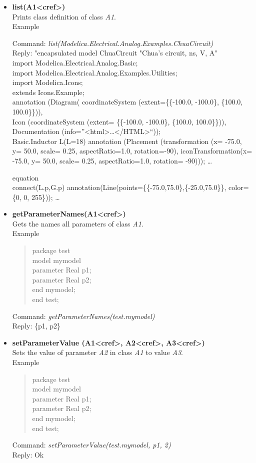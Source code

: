 \documentclass[11pt,a4paper,oneside,english]{book}
\newenvironment{modelicaExamples}{\begin{itemize}}{\end{itemize}}
\newcommand{\api}[2]{\item \textbf{#1} \\ #2}
\newcommand{\tab}{\hspace{2em}}
\newcommand{\command}[1]{Command: \textit{#1}\\}
\newcommand{\reply}[1]{Reply: #1}
\newcommand{\functionex}[2]{\begin{singlespace} \command{#1} \reply{#2} \end{singlespace}}
\newcommand{\examples}{Example}
\newenvironment{mocode}{\begin{verse}\begin{singlespace}\begin{scriptsize}\ttfamily}{\end{scriptsize}\end{singlespace}\end{verse}}
\begin{document}
\begin{modelicaExamples}
		\api{list(A1<cref>)}{Prints class definition of class \textit{A1}.\\
		\examples
		\functionex{list(Modelica.Electrical.Analog.Examples.ChuaCircuit)}
		{"encapsulated model ChuaCircuit "Chua's circuit, ns, V, A"\\
			import Modelica.Electrical.Analog.Basic;\\
			import Modelica.Electrical.Analog.Examples.Utilities;\\
			import Modelica.Icons;\\
			extends Icons.Example;\\
			annotation (Diagram( coordinateSystem (extent=\{\{-100.0, -100.0\}, \{100.0, 100.0\}\})),\\ Icon (coordinateSystem (extent= \{\{-100.0, -100.0\}, \{100.0, 100.0\}\})), Documentation (info=''<html>\dots</HTML>``));\\
			Basic.Inductor L(L=18) annota\-ti\-on (Placement (transformation (x= -75.0, y= 50.0, scale= 0.25, aspectRatio=1.0, rotation=-90), iconTransformation(x= -75.0, y= 50.0, scale= 0.25, aspectRatio=1.0, rotation= -90)));
			\dots
	
			equation\\
			\tab connect(L.p,G.p) annotation(Line(points=\{\{-75.0,75.0\},\{-25.0,75.0\}\}, color= \{0, 0, 255\}));
			\dots
			}
		}
		
		\api{getParameterNames(A1<cref>)}{Gets the names all parameters of  class \textit{A1}.\\
		\examples
		\begin{mocode}
		package test\\
		\tab model mymodel\\
		\tab\tab parameter Real p1;\\
		\tab\tab parameter Real p2;\\
		\tab end mymodel;\\
		end test;\\
		\end{mocode}

		\functionex{getParameterNames(test.mymodel)}
		{\{p1, p2\}}
		}
		
		\api{setParameterValue (A1<cref>, A2<cref>, A3<cref>)}{Sets the value of parameter \textit{A2} in class \textit{A1} to value \textit{A3}.\\
		\examples
		\begin{mocode}
		package test \\
		\tab model mymodel\\
		\tab\tab parameter Real p1;\\
		\tab\tab parameter Real p2;\\
		\tab end mymodel;\\
		end test;\\
		\end{mocode}
		\functionex{setParameterValue(test.mymodel, p1, 2)}
		{Ok}
		
}
\end{modelicaExamples}
\end{document}

